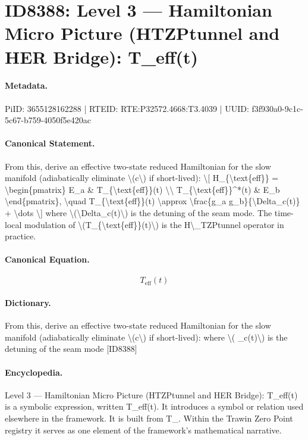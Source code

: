 \section*{ID8388: Level 3 — Hamiltonian Micro Picture (HTZPtunnel and HER Bridge): T\_eff(t)}
\paragraph{Metadata.}
PiID: 3655128162288 | RTEID: RTE:P32572.4668:T3.4039 | UUID: f3f930a0-9c1c-5c67-b759-4050f5e420ac

\paragraph{Canonical Statement.}
From this, derive an effective two-state reduced Hamiltonian for the slow manifold (adiabatically eliminate \textbackslash{}(c\textbackslash{}) if short-lived): \textbackslash{}[ H\_\{\textbackslash{}text\{eff\}\} = \textbackslash{}begin\{pmatrix\} E\_a \& T\_\{\textbackslash{}text\{eff\}\}(t) \textbackslash{}\textbackslash{} T\_\{\textbackslash{}text\{eff\}\}\textasciicircum{}*(t) \& E\_b \textbackslash{}end\{pmatrix\}, \textbackslash{}quad T\_\{\textbackslash{}text\{eff\}\}(t) \textbackslash{}approx \textbackslash{}frac\{g\_a g\_b\}\{\textbackslash{}Delta\_c(t)\} + \textbackslash{}dots \textbackslash{}] where \textbackslash{}(\textbackslash{}Delta\_c(t)\textbackslash{}) is the detuning of the seam mode. The time-local modulation of \textbackslash{}(T\_\{\textbackslash{}text\{eff\}\}(t)\textbackslash{}) is the H\textbackslash{}\_TZPtunnel operator in practice.

\paragraph{Canonical Equation.}
\[
T_{\text{eff}}(t)
\]

\paragraph{Dictionary.}
From this, derive an effective two-state reduced Hamiltonian for the slow manifold (adiabatically eliminate \textbackslash{}(c\textbackslash{}) if short-lived): where \textbackslash{}( \_c(t)\textbackslash{}) is the detuning of the seam mode [ID8388]

\paragraph{Encyclopedia.}
Level 3 — Hamiltonian Micro Picture (HTZPtunnel and HER Bridge): T\_eff(t) is a symbolic expression, written T\_eff(t). It introduces a symbol or relation used elsewhere in the framework. It is built from T\_. Within the Trawin Zero Point registry it serves as one element of the framework's mathematical narrative.
